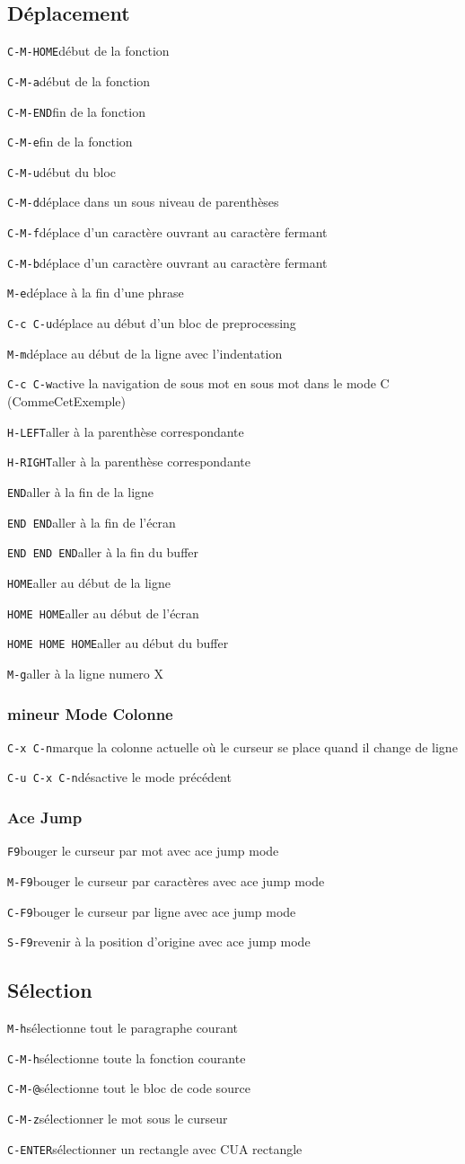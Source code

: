 \documentclass[10pt,landscape]{article}
\def\cm#1#2{{\tt#1}\dotfill#2\par}
\begin{document}
\begin{multicols}{3}
\subsection{Déplacement}
\cm{C-M-HOME}{début de la fonction}
\cm{C-M-a}{début de la fonction}
\cm{C-M-END}{fin de la fonction}
\cm{C-M-e}{fin de la fonction}
\cm{C-M-u}{début du bloc}
\cm{C-M-d}{déplace dans un sous niveau de parenthèses}
\cm{C-M-f}{déplace d'un caractère ouvrant au caractère fermant}
\cm{C-M-b}{déplace d'un caractère ouvrant au caractère fermant}
\cm{M-e}{déplace à la fin d'une phrase}
\cm{C-c C-u}{déplace au début d'un bloc de preprocessing}
\cm{M-m}{déplace au début de la ligne avec l'indentation}
\cm{C-c C-w}{active la navigation de sous mot en sous mot dans le mode C (CommeCetExemple)}
\cm{H-LEFT}{aller à la parenthèse correspondante}
\cm{H-RIGHT}{aller à la parenthèse correspondante}
\cm{END}{aller à la fin de la ligne}
\cm{END END}{aller à la fin de l'écran}
\cm{END END END}{aller à la fin du buffer}
\cm{HOME}{aller au début de la ligne}
\cm{HOME HOME}{aller au début de l'écran}
\cm{HOME HOME HOME}{aller au début du buffer}
\cm{M-g}{aller à la ligne numero X}

\subsubsection{mineur Mode Colonne}
\cm{C-x C-n}{marque la colonne actuelle où le curseur se place quand il change de ligne}
\cm{C-u C-x C-n}{désactive le mode précédent}

\subsubsection{Ace Jump}
\cm{F9}{bouger le curseur par mot avec ace jump mode}
\cm{M-F9}{bouger le curseur par caractères avec ace jump mode}
\cm{C-F9}{bouger le curseur par ligne avec ace jump mode}
\cm{S-F9}{revenir à la position d'origine avec ace jump mode}





\subsection{Sélection}
\cm{M-h}{sélectionne tout le paragraphe courant}
\cm{C-M-h}{sélectionne toute la fonction courante}
\cm{C-M-@}{sélectionne tout le bloc de code source}
\cm{C-M-z}{sélectionner le mot sous le curseur}
\cm{C-ENTER}{sélectionner un rectangle avec CUA rectangle}


\end{multicols}
\end{document}
